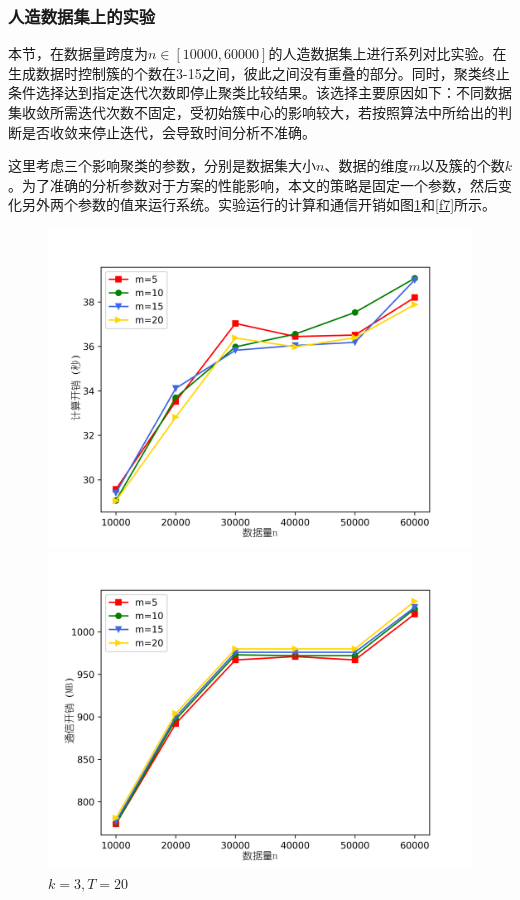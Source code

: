 \subsubsection{人造数据集上的实验}
本节，在数据量跨度为$ n\in[10000,60000] $的人造数据集上进行系列对比实验。在生成数据时控制簇的个数在3-15之间，彼此之间没有重叠的部分。同时，聚类终止条件选择达到指定迭代次数即停止聚类比较结果。该选择主要原因如下：不同数据集收敛所需迭代次数不固定，受初始簇中心的影响较大，若按照算法中所给出的判断是否收敛来停止迭代，会导致时间分析不准确。

这里考虑三个影响聚类的参数，分别是数据集大小$ n $、数据的维度$ m $以及簇的个数$ k $。为了准确的分析参数对于方案的性能影响，本文的策略是固定一个参数，然后变化另外两个参数的值来运行系统。实验运行的计算和通信开销如图\ref{f6}和\ref{f7}所示。
\begin{figure}[htbp] %
	\begin{minipage}[t]{0.5\linewidth}
		\includegraphics[width=\linewidth]{img/m.png}

	\end{minipage}%
	\hfill%
	\begin{minipage}[t]{0.5\linewidth}
		\includegraphics[width=\linewidth]{img/m_comm.png}

	\end{minipage}
	\caption{$k=3, T=20$}
	\label{f6}
\end{figure}

